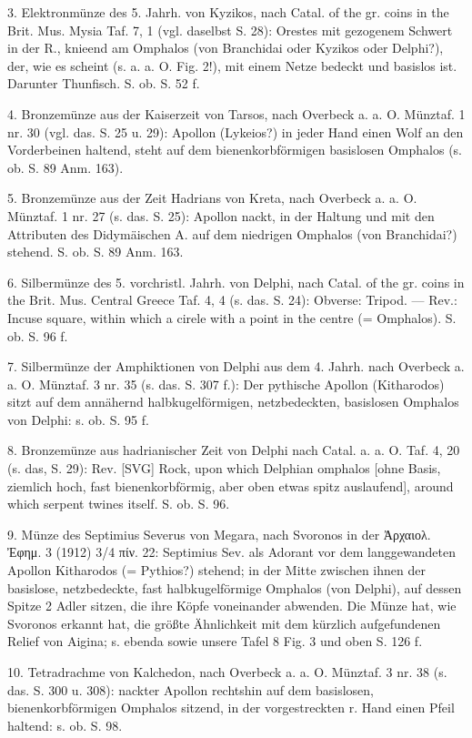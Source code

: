 \documentclass[a4paper, 11pt, oneside]{article}
\begin{document}
3. Elektronmünze des 5. Jahrh. von Kyzikos, nach Catal. of the gr. coins in the Brit. Mus. Mysia Taf. 7, 1 (vgl. daselbst S. 28): Orestes mit gezogenem Schwert in der R., knieend am Omphalos (von Branchidai oder Kyzikos oder Delphi?), der, wie es scheint (s. a. a. O. Fig. 2!), mit einem Netze bedeckt und basislos ist. Darunter Thunfisch. S. ob. S. 52 f.

4. Bronzemünze aus der Kaiserzeit von Tarsos, nach Overbeck a. a. O. Münztaf. 1 nr. 30 (vgl. das. S. 25 u. 29): Apollon (Lykeios?) in jeder Hand einen Wolf an den Vorderbeinen haltend, steht auf dem bienenkorbförmigen basislosen Omphalos (s. ob. S. 89 Anm. 163).

5. Bronzemünze aus der Zeit Hadrians von Kreta, nach Overbeck a. a. O. Münztaf. 1 nr. 27 (s. das. S. 25): Apollon nackt, in der Haltung und mit den Attributen des Didymäischen A. auf dem niedrigen Omphalos (von Branchidai?) stehend. S. ob. S. 89 Anm. 163.

6. Silbermünze des 5. vorchristl. Jahrh. von Delphi, nach Catal. of the gr. coins in the Brit. Mus. Central Greece Taf. 4, 4 (s. das. S. 24): Obverse: Tripod. --- Rev.: Incuse square, within which a cirele with a point in the centre (= Omphalos). S. ob. S. 96 f.

7. Silbermünze der Amphiktionen von Delphi aus dem 4. Jahrh. nach Overbeck a. a. O. Münztaf. 3 nr. 35 (s. das. S. 307 f.): Der pythische Apollon (Kitharodos) sitzt auf dem annähernd halbkugelförmigen, netzbedeckten, basislosen Omphalos von Delphi: s. ob. S. 95 f.

8. Bronzemünze aus hadrianischer Zeit von Delphi nach Catal. a. a. O. Taf. 4, 20 (s. das, S. 29): Rev. [SVG] Rock, upon which Delphian omphalos [ohne Basis, ziemlich hoch, fast bienenkorbförmig, aber oben etwas spitz auslaufend], around which serpent twines itself. S. ob. S. 96.

9. Münze des Septimius Severus von Megara, nach Svoronos in der Ἀρχαιολ. Ἐφημ. 3 (1912) 3/4 πίν. 22: Septimius Sev. als Adorant vor dem langgewandeten Apollon Kitharodos (= Pythios?) stehend; in der Mitte zwischen ihnen der basislose, netzbedeckte, fast halbkugelförmige Omphalos (von Delphi), auf dessen Spitze 2 Adler sitzen, die ihre Köpfe voneinander abwenden. Die Münze hat, wie Svoronos erkannt hat, die größte Ähnlichkeit mit dem kürzlich aufgefundenen Relief von Aigina; s. ebenda sowie unsere Tafel 8 Fig. 3 und oben S. 126 f.

10. Tetradrachme von Kalchedon, nach Overbeck a. a. O. Münztaf. 3 nr. 38 (s. das. S. 300 u. 308): nackter Apollon rechtshin auf dem basislosen, bienenkorbförmigen Omphalos sitzend, in der vorgestreckten r. Hand einen Pfeil haltend: s. ob. S. 98.
\end{document}
